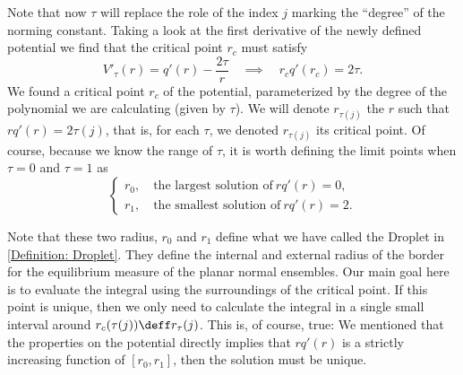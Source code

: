 Note that now $\tau$ will replace the role of the index $j$ marking the \enquote{degree} of the norming constant. Taking a look at the first derivative of the newly defined potential we find that the critical point $r_c$ must satisfy
\begin{equation}
	V'_\tau(r) = q'(r) - \frac{2\tau}{r} \quad \implies \quad r_c q'(r_c) = 2 \tau.
\end{equation}
We found a critical point $r_c$ of the potential, parameterized by the degree of the polynomial we are calculating (given by $\tau$). We will denote $r_{\tau(j)}$ the $r$ such that $ r q'(r) = 2 \tau(j)$, that is, for each $\tau$, we denoted $r_{\tau(j)}$ its critical point. Of course, because we know the range of $\tau$, it is worth defining the limit points when $\tau = 0$ and $\tau = 1$ as
\begin{equation}
	\begin{cases}
		r_0, \quad \text{the largest solution of} \ r q'(r) = 0, \\
		r_ 1, \quad \text{the smallest solution of} \ r q'(r) = 2.
	\end{cases}
\end{equation}

Note that these two radius, $r_0$ and $r_1$ define what we have called the Droplet in \autoref{Definition: Droplet}. They define the internal and external radius of the border for the equilibrium measure of the planar normal ensembles. Our main goal here is to evaluate the integral using the surroundings of the critical point. If this point is unique, then we only need to calculate the integral in a single small interval around $r_c(\tau(j)) \deff r_\tau(j)$. This is, of course, true: We mentioned that the properties on the potential directly implies that $r q'(r)$ is a strictly increasing function of $[r_0, r_1]$, then the solution must be unique. 

